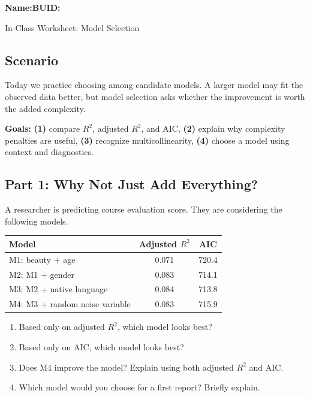 \documentclass{article}
\newcommand{\blankline}[1]{\underline{\hspace{#1}}}
\begin{document}
\noindent\textbf{Name:}\blankline{2.25in}\hfill\textbf{BUID:}\blankline{1.55in}\newline

\begin{center}
 \Large In-Class Worksheet: Model Selection
\end{center}

\subsection*{Scenario}
Today we practice choosing among candidate models. A larger model may fit the observed data better, but model selection asks whether the improvement is worth the added complexity.

\medskip
\noindent\textbf{Goals:} \textbf{(1)} compare $R^2$, adjusted $R^2$, and AIC, \textbf{(2)} explain why complexity penalties are useful, \textbf{(3)} recognize multicollinearity, \textbf{(4)} choose a model using context and diagnostics.

\subsection*{Part 1: Why Not Just Add Everything?}
A researcher is predicting course evaluation score. They are considering the following models.

\begin{center}
\renewcommand{\arraystretch}{1.35}
\begin{tabular}{lcc}
\toprule
\textbf{Model} & \textbf{Adjusted }\boldmath$R^2$ & \textbf{AIC} \\
\midrule
M1: beauty + age & 0.071 & 720.4 \\
M2: M1 + gender & 0.083 & 714.1 \\
M3: M2 + native language & 0.084 & 713.8 \\
M4: M3 + random noise variable & 0.083 & 715.9 \\
\bottomrule
\end{tabular}
\end{center}

\begin{enumerate}[label={\bfseries (\Alph*)},itemsep=.8em]
\item Based only on adjusted $R^2$, which model looks best? \hfill \blankline{1.3in}
\item Based only on AIC, which model looks best? \hfill \blankline{1.3in}
\item Does M4 improve the model? Explain using both adjusted $R^2$ and AIC. \\[3.5em]
\item Which model would you choose for a first report? Briefly explain. \\[4em]
\end{enumerate}
\end{document}
